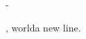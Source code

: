 -\documentclass{article}\n\begin{document}\nHello, world\nAdding a new line.\n\end{document}
\begin{document}
+%
+
+
+
+
\end{document}
